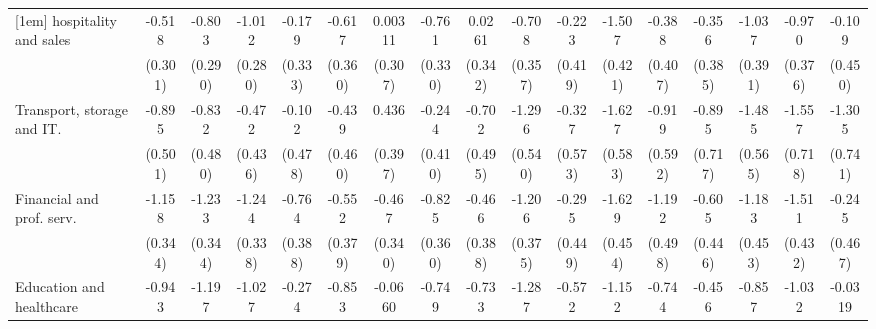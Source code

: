 {\begin{tabular}{l*{16}{c}}
[1em]
hospitality and sales&      -0.518         &      -0.803\sym{**} &      -1.012\sym{***}&      -0.179         &      -0.617         &     0.00311         &      -0.761\sym{*}  &      0.0261         &      -0.708\sym{*}  &      -0.223         &      -1.507\sym{***}&      -0.388         &      -0.356         &      -1.037\sym{**} &      -0.970\sym{**} &      -0.109         \\
                    &     (0.301)         &     (0.290)         &     (0.280)         &     (0.333)         &     (0.360)         &     (0.307)         &     (0.330)         &     (0.342)         &     (0.357)         &     (0.419)         &     (0.421)         &     (0.407)         &     (0.385)         &     (0.391)         &     (0.376)         &     (0.450)         \\
[1em]
Transport, storage and IT.&      -0.895         &      -0.832         &      -0.472         &      -0.102         &      -0.439         &       0.436         &      -0.244         &      -0.702         &      -1.296\sym{*}  &      -0.327         &      -1.627\sym{**} &      -0.919         &      -0.895         &      -1.485\sym{**} &      -1.557\sym{*}  &      -1.305         \\
                    &     (0.501)         &     (0.480)         &     (0.436)         &     (0.478)         &     (0.460)         &     (0.397)         &     (0.410)         &     (0.495)         &     (0.540)         &     (0.573)         &     (0.583)         &     (0.592)         &     (0.717)         &     (0.565)         &     (0.718)         &     (0.741)         \\
[1em]
Financial and prof. serv.&      -1.158\sym{***}&      -1.233\sym{***}&      -1.244\sym{***}&      -0.764\sym{*}  &      -0.552         &      -0.467         &      -0.825\sym{*}  &      -0.466         &      -1.206\sym{**} &      -0.295         &      -1.629\sym{***}&      -1.192\sym{*}  &      -0.605         &      -1.183\sym{**} &      -1.511\sym{***}&      -0.245         \\
                    &     (0.344)         &     (0.344)         &     (0.338)         &     (0.388)         &     (0.379)         &     (0.340)         &     (0.360)         &     (0.388)         &     (0.375)         &     (0.449)         &     (0.454)         &     (0.498)         &     (0.446)         &     (0.453)         &     (0.432)         &     (0.467)         \\
[1em]
Education and healthcare&      -0.943\sym{**} &      -1.197\sym{***}&      -1.027\sym{**} &      -0.274         &      -0.853\sym{*}  &     -0.0660         &      -0.749\sym{*}  &      -0.733         &      -1.287\sym{***}&      -0.572         &      -1.152\sym{**} &      -0.744         &      -0.456         &      -0.857\sym{*}  &      -1.032\sym{**} &     -0.0319         \\

\end{tabular}}
